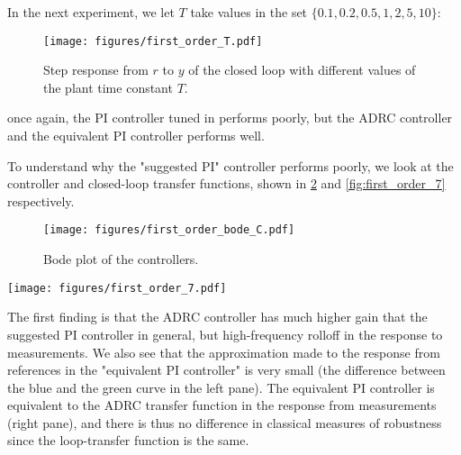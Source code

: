 \documentclass[letterpaper, 10 pt, conference]{ieeeconf}
\begin{document}
In the next experiment, we let $T$ take values in the set $\{0.1, 0.2, 0.5, 1, 2, 5, 10\}$:
\begin{figure}[h]
	\centering
	\texttt{[image: figures/first\_order\_T.pdf]}
	\caption{Step response from $r$ to $y$  of the closed loop with different values of the plant time constant $T$.}
	\label{fig:first_order_T}
\end{figure}
once again, the PI controller tuned in \cite{herbst2013simulative} performs poorly, but the ADRC controller and the equivalent PI controller performs well.

To understand why the "suggested PI" controller performs poorly, we look at the controller and closed-loop transfer functions, shown in \cref{fig:first_order_bode_C} and \cref{fig:first_order_7} respectively.
\begin{figure}[h]
	\centering
	\texttt{[image: figures/first\_order\_bode\_C.pdf]}
	\caption{Bode plot of the controllers.}
	\label{fig:first_order_bode_C}
\end{figure}
\begin{figure*}[h]
	\centering
	\texttt{[image: figures/first\_order\_7.pdf]}
	\caption{Gang-of-seven plot for the first-order system. The ADRC controller is shown in blue, the PI controller suggested in \cite{herbst2013simulative} is shown in orange, and the equivalent PI controller proposed in this paper is shown in green. The ADRC and the equivalent PI controller are identical in most transfer functions (all solid lines, including only the loop-transfer function) and are hard to distinguish in the plots. The equivalent PI controller does differ slightly from the ADRC controller in the response from references (dashed lines). The plots show the sensitivity function $S = 1/(1+PC)$ (top left), the input disturbance rejection $PS = P/(1+PC)$ (top right), the measurement noise amplification in the control signal $CS = C/(1+PC)$ (bottom left), and the complementary sensitivity function $T = PC/(1+PC)$ (bottom right). Where relevant, the transfer function post multiplied by $F = -C_r / C_y$ is shown as well, indicating the response from references.}
	\label{fig:first_order_7}
\end{figure*}


The first finding is that the ADRC controller has much higher gain that the suggested PI controller in general, but high-frequency rolloff in the response to measurements. We also see that the approximation made to the response from references in the "equivalent PI controller" is very small (the difference between the blue and the green curve in the left pane). The equivalent PI controller is equivalent to the ADRC transfer function in the response from measurements (right pane), and there is thus no difference in classical measures of robustness since the loop-transfer function is the same.
\end{document}
